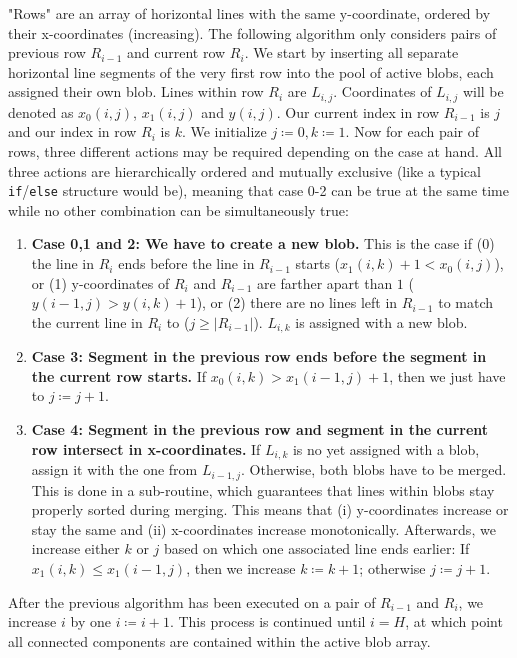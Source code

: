 \documentclass[9pt,lineno]{elife}
\begin{document}
\begin{appendixbox}
"Rows" are an array of horizontal lines with the same y-coordinate, ordered by their x-coordinates (increasing). The following algorithm only considers pairs of previous row $R_{i-1}$ and current row $R_i$. We start by inserting all separate horizontal line segments of the very first row into the pool of active blobs, each assigned their own blob. Lines within row $R_i$ are $L_{i,j}$. Coordinates of $L_{i,j}$ will be denoted as $x_0(i,j)$, $x_1(i,j)$ and $y(i,j)$. Our current index in row $R_{i-1}$ is $j$ and our index in row $R_{i}$ is $k$. We initialize $j\coloneqq 0, k\coloneqq 1$. Now for each pair of rows, three different actions may be required depending on the case at hand. All three actions are hierarchically ordered and mutually exclusive (like a typical \texttt{if}/\texttt{else} structure would be), meaning that case 0-2 can be true at the same time while no other combination can be simultaneously true:

\begin{enumerate}
    \item \textbf{Case 0,1 and 2: We have to create a new blob.} This is the case if (0) the line in $R_i$ ends before the line in $R_{i-1}$ starts ($x_1(i,k)+1 < x_0(i,j)$), or (1) y-coordinates of $R_i$ and $R_{i-1}$ are farther apart than $1$ ($y(i-1,j) > y(i,k)+1$), or (2) there are no lines left in $R_{i-1}$ to match the current line in $R_i$ to ($j \geq |R_{i-1}|$). $L_{i,k}$ is assigned with a new blob.
    
    \item \textbf{Case 3: Segment in the previous row ends before the segment in the current row starts.} If $x_0(i,k) > x_1(i-1,j) + 1$, then we just have to $j \coloneqq j + 1$.
    
    \item \textbf{Case 4: Segment in the previous row and segment in the current row intersect in x-coordinates.} If $L_{i,k}$ is no yet assigned with a blob, assign it with the one from $L_{i-1,j}$. Otherwise, both blobs have to be merged. This is done in a sub-routine, which guarantees that lines within blobs stay properly sorted during merging. This means that (i) y-coordinates increase or stay the same and (ii) x-coordinates increase monotonically. Afterwards, we increase either $k$ or $j$ based on which one associated line ends earlier: If $x_1(i,k) \leq x_1(i-1,j)$, then we increase $k \coloneqq k + 1$; otherwise $j \coloneqq j + 1$.
\end{enumerate}

After the previous algorithm has been executed on a pair of $R_{i-1}$ and $R_{i}$, we increase $i$ by one $i \coloneqq i + 1$. This process is continued until $i = H$, at which point all connected components are contained within the active blob array.


\end{appendixbox}
\end{document}
